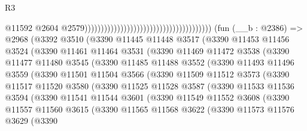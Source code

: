 \begin{lexlean}{R3}
\begin{coremodule}
                                                                                  @11592
                                                                                  @2604
                                                                                  @2579)))))))))))))))))))))))))))))))))))))))
    (fun (__b : @2386) =>
    @2968
      (@3392
        @3510
        (@3390
          @11445
          @11448
          @3517
          (@3390
            @11453
            @11456
            @3524
            (@3390
              @11461
              @11464
              @3531
              (@3390
                @11469
                @11472
                @3538
                (@3390
                  @11477
                  @11480
                  @3545
                  (@3390
                    @11485
                    @11488
                    @3552
                    (@3390
                      @11493
                      @11496
                      @3559
                      (@3390
                        @11501
                        @11504
                        @3566
                        (@3390
                          @11509
                          @11512
                          @3573
                          (@3390
                            @11517
                            @11520
                            @3580
                            (@3390
                              @11525
                              @11528
                              @3587
                              (@3390
                                @11533
                                @11536
                                @3594
                                (@3390
                                  @11541
                                  @11544
                                  @3601
                                  (@3390
                                    @11549
                                    @11552
                                    @3608
                                    (@3390
                                      @11557
                                      @11560
                                      @3615
                                      (@3390
                                        @11565
                                        @11568
                                        @3622
                                        (@3390
                                          @11573
                                          @11576
                                          @3629
                                          (@3390

\end{coremodule}
\end{lexlean}
